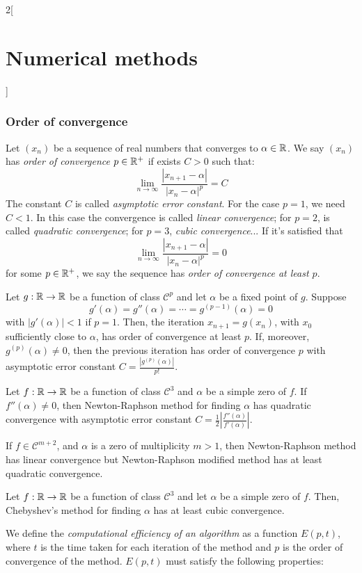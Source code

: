 \documentclass[../../../main.tex]{subfiles}
\begin{document}
\begin{multicols}{2}[\section{Numerical methods}]
\subsubsection*{Order of convergence}
\begin{definition}
    Let $(x_n)$ be a sequence of real numbers that converges to $\alpha\in\mathbb{R}$. We say $(x_n)$ has \textit{order of convergence $p\in\mathbb{R}^+$} if exists $C>0$ such that: $$\lim_{n\to\infty}\frac{|x_{n+1}-\alpha|}{|x_n-\alpha|^p}=C$$ The constant $C$ is called \textit{asymptotic error constant}. For the case $p=1$, we need $C<1$. In this case the convergence is called \textit{linear convergence}; for $p=2$, is called \textit{quadratic convergence}; for $p=3$, \textit{cubic convergence}... If it's satisfied that $$\lim_{n\to\infty}\frac{|x_{n+1}-\alpha|}{|x_n-\alpha|^p}=0$$ for some $p\in\mathbb{R}^+$, we say the sequence has \textit{order of convergence at least $p$}.
\end{definition}
\begin{theorem}
    Let $g:\mathbb{R}\rightarrow\mathbb{R}$ be a function of class $\mathcal{C}^p$ and let $\alpha$ be a fixed point of $g$. Suppose $$g'(\alpha)=g''(\alpha)=\cdots=g^{(p-1)}(\alpha)=0$$ with $|g'(\alpha)|<1$ if $p=1$. Then, the iteration $x_{n+1}=g(x_n)$, with $x_0$ sufficiently close to $\alpha$, has order of convergence at least $p$. If, moreover, $g^{(p)}(\alpha)\ne0$, then the previous iteration has order of convergence $p$ with asymptotic error constant $C=\frac{|g^{(p)}(\alpha)|}{p!}$.
\end{theorem}
\begin{theorem}
    Let $f:\mathbb{R}\rightarrow\mathbb{R}$ be a function of class $\mathcal{C}^3$ and $\alpha$ be a simple zero of $f$. If $f''(\alpha)\ne0$, then Newton-Raphson method for finding $\alpha$ has quadratic convergence with asymptotic error constant $C=\frac{1}{2}\left|\frac{f''(\alpha)}{f'(\alpha)}\right|$.\par If $f\in\mathcal{C}^{m+2}$, and $\alpha$ is a zero of multiplicity $m>1$, then Newton-Raphson method has linear convergence but Newton-Raphson modified method has at least quadratic convergence.
\end{theorem}
\begin{theorem}
    Let $f:\mathbb{R}\rightarrow\mathbb{R}$ be a function of class $\mathcal{C}^3$ and let $\alpha$ be a simple zero of $f$. Then, Chebyshev's method for finding $\alpha$ has at least cubic convergence.
\end{theorem}
\begin{definition}
    We define the \textit{computational efficiency of an algorithm} as a function $E(p,t)$, where $t$ is the time taken for each iteration of the method and $p$ is the order of convergence of the method. $E(p,t)$ must satisfy the following properties:

\end{definition}
\end{multicols}
\end{document}

